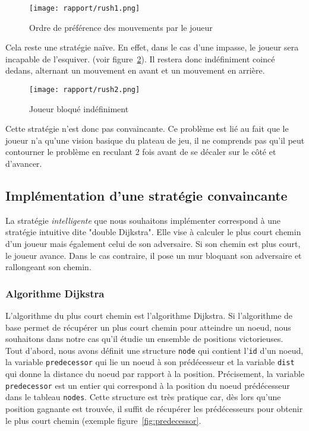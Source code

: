 \documentclass[a4paper]{article}
\begin{document}
\begin{figure}[ht]
    \centering
    \texttt{[image: rapport/rush1.png]}
    \caption{Ordre de préférence des mouvements par le joueur }
    \label{fig:rush1}
\end{figure}

Cela reste une stratégie naïve. En effet, dans le cas d'une impasse, le joueur sera incapable de l'esquiver. (voir figure~\ref{fig:rush2}). Il restera donc indéfiniment coincé dedans, alternant un mouvement en avant et un mouvement en arrière. \\

\begin{figure}[h!t]
    \centering
    \texttt{[image: rapport/rush2.png]}
    \caption{Joueur  bloqué indéfiniment}
    \label{fig:rush2}
\end{figure}

Cette stratégie n'est donc pas convaincante. Ce problème est lié au fait que le joueur n'a qu'une vision basique du plateau de jeu, il ne comprends pas qu'il peut contourner le problème en reculant 2 fois avant de se décaler sur le côté et d'avancer.

\subsection{Implémentation d'une stratégie convaincante}

La stratégie \textit{intelligente} que nous souhaitons implémenter correspond à une stratégie intuitive dite "double Dijkstra". Elle vise à calculer le plus court chemin d'un joueur mais également celui de son adversaire. Si son chemin est plus court, le joueur avance. Dans le cas contraire, il pose un mur bloquant son adversaire et rallongeant son chemin.

\subsubsection{Algorithme Dijkstra}
L'algorithme du plus court chemin est l'algorithme Dijkstra. Si l'algorithme de base permet de récupérer un plus court chemin pour atteindre un noeud, nous souhaitons dans notre cas qu'il étudie un ensemble de positions victorieuses. \\

Tout d'abord, nous avons définit une structure \texttt{node} qui contient l'\texttt{id} d'un noeud, la variable \texttt{predecessor} qui lie un noeud à son prédécesseur et la variable \texttt{dist} qui donne la distance du noeud par rapport à la position. Précisement, la variable \texttt{predecessor} est un entier qui correspond à la position du noeud prédécesseur dans le tableau \texttt{nodes}. Cette structure est très pratique car, dès lors qu'une position gagnante est trouvée, il suffit de récupérer les prédécesseurs pour obtenir le plus court chemin (exemple figure~\ref{fig:predecessor}. \\
\end{document}
